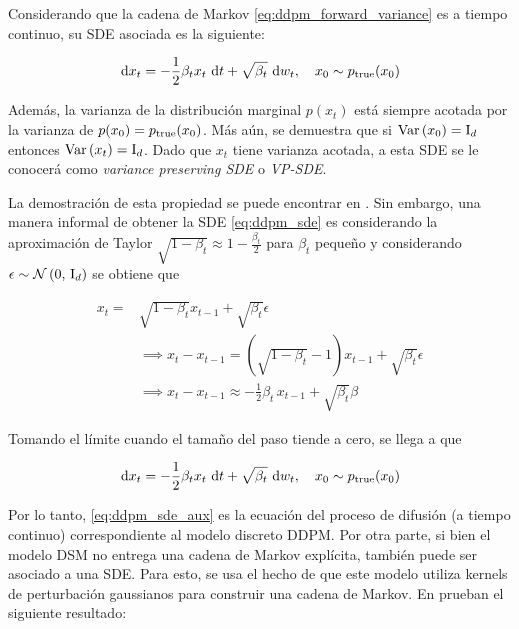 \begin{prop}
    Considerando que la cadena de Markov \eqref{eq:ddpm_forward_variance} es a tiempo continuo, su SDE asociada es la siguiente:

    \begin{equation}
        \label{eq:ddpm_sde}
        \,\operatorname{d}\! x_t = -\frac{1}{2}\beta_t x_t \,\operatorname{d}\! t + \sqrt{\beta_t}\,\operatorname{d}\! w_t, \quad x_0\sim p_{\operatorname{true}}(x_0)
    \end{equation}

    Además, la varianza de la distribución marginal $p(x_t)$ está siempre acotada por la varianza de $p(x_0)=p_{\operatorname{true}}(x_0)$. Más aún, se demuestra que si $\operatorname{Var}\left(x_0\right)=\operatorname{I}_{d}$ entonces $\operatorname{Var}\left(x_t\right)=\operatorname{I}_{d}$. Dado que $x_t$ tiene varianza acotada, a esta SDE se le conocerá como \textit{variance preserving SDE} o \textit{VP-SDE}.
\end{prop}

La demostración de esta propiedad se puede encontrar en \cite{song2021scorebased}. Sin embargo, una manera informal de obtener la SDE \eqref{eq:ddpm_sde} es considerando la aproximación de Taylor $\sqrt{1 - \beta_t} \approx 1 - \frac{\beta_t}{2}$ para $\beta_t$ pequeño y considerando $\epsilon\sim\mathcal{N}\left(0,\,\operatorname{I}_{d}\right)$ se obtiene que

\begin{align*}
    x_t =& \sqrt{1 - \beta_t} x_{t-1} + \sqrt{\beta_t} \epsilon\\
    &\implies x_t - x_{t-1} = (\sqrt{1 - \beta_t} - 1) x_{t-1} + \sqrt{\beta_t} \epsilon\\
    &\implies x_t - x_{t-1} \approx -\frac{1}{2}\beta_t\, x_{t-1} + \sqrt{\beta_t} \beta
\end{align*}

Tomando el límite cuando el tamaño del paso tiende a cero, se llega a que

\begin{equation*}
    \label{eq:ddpm_sde_aux}
    \,\operatorname{d}\! x_t = -\frac{1}{2} \beta_t x_t \,\operatorname{d}\! t + \sqrt{\beta_t} \,\operatorname{d}\! w_t, \quad x_0\sim p_{\operatorname{true}}(x_0)
\end{equation*}

Por lo tanto, \eqref{eq:ddpm_sde_aux} es la ecuación del proceso de difusión (a tiempo continuo) correspondiente al modelo discreto DDPM. Por otra parte, si bien el modelo DSM no entrega una cadena de Markov explícita, también puede ser asociado a una SDE. Para esto, se usa el hecho de que este modelo utiliza kernels de perturbación gaussianos para construir una cadena de Markov. En \cite{song2021scorebased} prueban el siguiente resultado:

